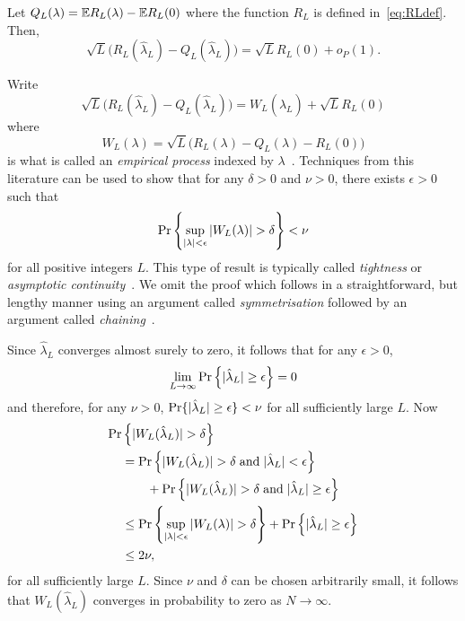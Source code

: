 \documentclass[draftcls, onecolumn, 11pt]{IEEEtran}
\begin{document}
\begin{lemma}\label{lem:empiricprocc} Let $Q_L(\lambda) = {\mathbb E} R_L(\lambda) - {\mathbb E} R_L(0)$ where the function $R_L$ is defined in~\eqref{eq:RLdef}.  Then,
\[
\sqrt{L}\big( R_L(\hat{\lambda}_L) - Q_L(\hat{\lambda}_L) \big) = \sqrt{L} R_L(0) + o_P(1).
\]
\end{lemma}
\begin{IEEEproof}
Write
\[
\sqrt{L}\big( R_L(\hat{\lambda}_L) - Q_L(\hat{\lambda}_L) \big) = W_L(\hat{\lambda}_L) + \sqrt{L} R_L(0)
\]
where
\begin{equation}\label{eq:WLdef}
W_L(\lambda) = \sqrt{L}\big( R_L(\lambda) - Q_L(\lambda) - R_L(0) \big)
\end{equation}
is what is called an \emph{empirical process} indexed by $\lambda$~\cite{Pollard_asymp_empi_proc_1989,Pollard_new_ways_clts_1986,van2009empirical,Pollard_conv_stat_proc_1984}.  Techniques from this literature can be used to show that
for any $\delta > 0$ and $\nu > 0$, there exists $\epsilon > 0$ such that
\[
\Pr\left\{ \sup_{{\vert \lambda \vert}<\epsilon}{\vert W_L(\lambda) \vert} > \delta  \right\} < \nu
\]
for all positive integers $L$.  This type of result is typically called \emph{tightness} or \emph{asymptotic continuity}~\cite{Pollard_asymp_empi_proc_1989,van2009empirical,Billingsley1999_convergence_of_probability_measures}.  We omit the proof which follows in a straightforward, but lengthy manner using an argument called \emph{symmetrisation} followed by an argument called \emph{chaining}~\cite{Pollard_asymp_empi_proc_1989,van2009empirical}.

Since $\hat{\lambda}_L$ converges almost surely to zero, it follows that for any $\epsilon > 0$,
\[
\lim_{L\rightarrow\infty}{\operatorname{Pr}}\left\{ {\vert \hat{\lambda}_L \vert} \geq \epsilon \right\} = 0
\] 
and therefore, for any $\nu > 0$, ${\operatorname{Pr}}\{ {\vert \hat{\lambda}_L \vert} \geq \epsilon \} < \nu$ for all sufficiently large $L$.  Now
\begin{align*}
  {\operatorname{Pr}}&\left\{{\vert  W_L(\hat{\lambda}_L)  \vert} > \delta \right\} \\
&= {\operatorname{Pr}}\left\{ {\vert W_L(\hat{\lambda}_L) \vert} > \delta \;\text{and} \; {\vert \hat{\lambda}_L \vert} < \epsilon \right\} \\
&\hspace{0.7cm} + {\operatorname{Pr}}\left\{ {\vert W_L(\hat{\lambda}_L) \vert} > \delta  \;\text{and} \; {\vert \hat{\lambda}_L \vert} \geq \epsilon \right\} \\
&\leq {\operatorname{Pr}}\left\{  \sup_{{\vert \lambda \vert} < \epsilon} {\vert  W_L(\lambda)  \vert} > \delta \right\} + {\operatorname{Pr}}\left\{ {\vert \hat{\lambda}_L \vert} \geq \epsilon \right\} \\
&\leq 2\nu,
\end{align*}
for all sufficiently large $L$.  Since $\nu$ and $\delta$ can be chosen arbitrarily small, it follows that $W_L(\hat{\lambda}_L)$ converges in probability to zero as $N\rightarrow\infty$.
\end{IEEEproof}
\end{document}
